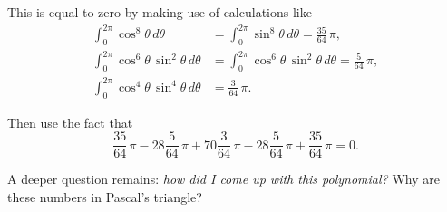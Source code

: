 \documentclass{ximera}
\begin{document}
\begin{exercise}
\begin{hint}
  This is equal to zero by making use of calculations like
  \begin{align*}
    \int_0^{2\pi} \cos^8 \theta \, d\theta &=   \int_0^{2\pi} \sin^8 \theta \, d\theta = \frac{35}{64} \, \pi, \\
    \int_0^{2\pi} \cos^6 \theta \, \sin^2 \theta \, d\theta &=   \int_0^{2\pi} \cos^6 \theta \, \sin^2 \theta \, d\theta = \frac{5}{64} \, \pi, \\
    \int_0^{2\pi} \cos^4 \theta \, \sin^4 \theta \, d\theta &= \frac{3}{64} \, \pi.
  \end{align*}
\end{hint}
\begin{hint}
  Then use the fact that
  $$
  \frac{35}{64} \, \pi - 28  \frac{5}{64} \, \pi + 70 \frac{3}{64} \, \pi - 28 \frac{5}{64} \, \pi + \frac{35}{64} \, \pi = 0.
  $$
\end{hint}
\begin{hint}
  A deeper question remains: \textit{how did I come up with this polynomial?}  Why are these numbers in Pascal's triangle?
\end{hint}
\end{exercise}
\end{document}
